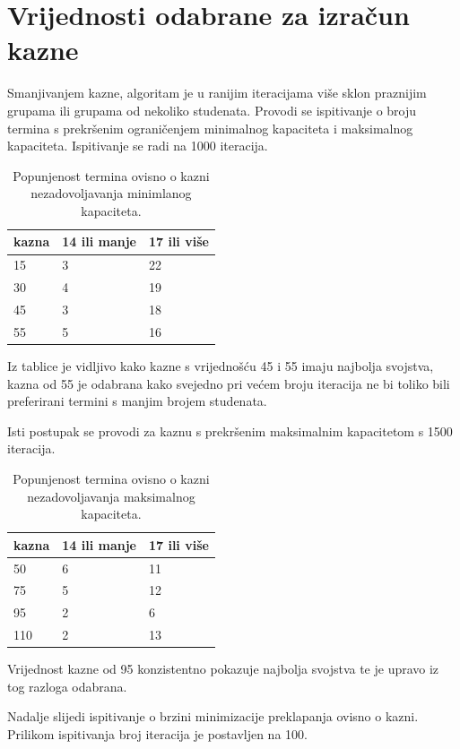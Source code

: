 \documentclass[times, utf8, zavrsni]{fer}
\begin{document}
\section{Vrijednosti odabrane za izračun kazne}

Smanjivanjem kazne, algoritam je u ranijim iteracijama više sklon praznijim grupama ili grupama od nekoliko studenata. Provodi se ispitivanje o broju termina s prekršenim ograničenjem minimalnog kapaciteta i maksimalnog kapaciteta. Ispitivanje se radi na 1000 iteracija.

\begin{table}[htb]
\caption{Popunjenost termina ovisno o kazni nezadovoljavanja minimlanog kapaciteta.}
\label{tbl:min-popunjenost}
\centering
\begin{tabular}{lll} \hline
kazna & 14 ili manje &  17 ili više \\ \hline
15 & 3 & 22 \\
30 & 4 & 19 \\
45 & 3 & 18 \\
55 & 5 & 16 \\ \hline
\end{tabular}
\end{table}

Iz tablice je vidljivo kako kazne s vrijednošću 45 i 55 imaju najbolja svojstva, kazna od 55 je odabrana kako svejedno pri većem broju iteracija ne bi toliko bili preferirani termini s manjim brojem studenata.

Isti postupak se provodi za kaznu s prekršenim maksimalnim kapacitetom s 1500 iteracija.

\begin{table}[htb]
\caption{Popunjenost termina ovisno o kazni nezadovoljavanja maksimalnog kapaciteta.}
\label{tbl:max-popunjenost}
\centering
\begin{tabular}{lll} \hline
kazna & 14 ili manje &  17 ili više \\ \hline
50 & 6  & 11  \\
75 & 5 & 12 \\
95 & 2 & 6 \\
110 & 2 & 13 \\ \hline
\end{tabular}
\end{table}

Vrijednost kazne od 95 konzistentno pokazuje najbolja svojstva te je upravo iz tog razloga odabrana.

Nadalje slijedi ispitivanje o brzini minimizacije preklapanja ovisno o kazni.  Prilikom ispitivanja broj iteracija je postavljen na 100.
\end{document}
